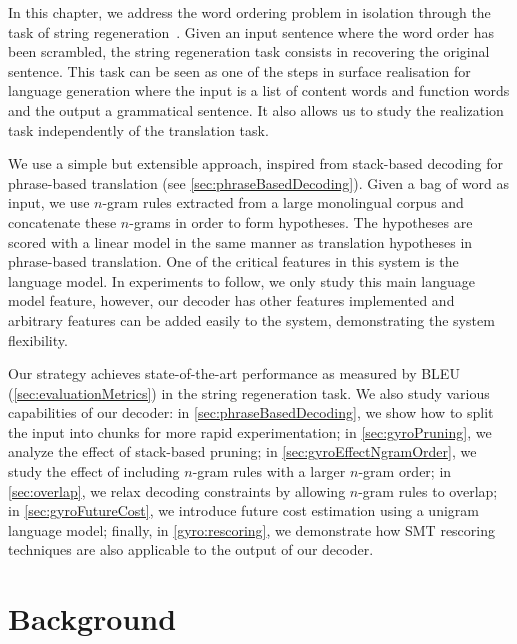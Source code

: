In this chapter, we address the word ordering problem in
isolation through the task of
string regeneration~\citep{wan-dras-dale-paris:2009:EACL}.
Given an input sentence where the word order has
been scrambled, the string regeneration task consists in recovering
the original sentence. This task can be seen as one of the
steps in surface realisation for language generation where
the input is a list of content words and function words and
the output a grammatical sentence. It also allows us to study
the realization task independently of the translation task.

We use a simple but extensible approach, inspired from
stack-based decoding for phrase-based
translation (see \autoref{sec:phraseBasedDecoding}).
Given a bag of word as input, we use $n$-gram rules
extracted from a large monolingual corpus and concatenate
these $n$-grams in order to form hypotheses. The hypotheses are scored
with a linear model in the same manner as translation
hypotheses in phrase-based translation.
One of the critical features in this system
is the language model. In experiments to follow, we only study
this main language model feature, however, our decoder has other features
implemented and
arbitrary features can be added easily to the
system, demonstrating the system flexibility.

Our strategy achieves state-of-the-art performance as
measured by BLEU (\autoref{sec:evaluationMetrics}) in the string regeneration
task. We also study various capabilities of our decoder: in
\autoref{sec:phraseBasedDecoding}, we show how to
split the input into chunks for more rapid experimentation;
in \autoref{sec:gyroPruning}, we analyze the effect of stack-based pruning;
in \autoref{sec:gyroEffectNgramOrder}, we study
the effect of including $n$-gram rules with a larger $n$-gram order;
in \autoref{sec:overlap}, we relax decoding constraints by allowing
$n$-gram rules to overlap; in \autoref{sec:gyroFutureCost}, we introduce
future cost estimation using a unigram language model; finally, in
\autoref{gyro:rescoring}, we demonstrate how SMT rescoring techniques
are also applicable to the output of our decoder.



\section{Background}
\label{sec:gyroBackground}

